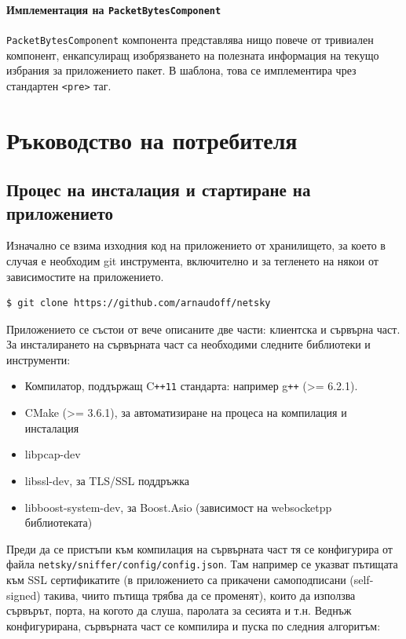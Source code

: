 \documentclass[12pt,a4paper,oneside]{book}
\begin{document}
\subsubsection{Имплементация на \texttt{PacketBytesComponent}}

\texttt{PacketBytesComponent} компонента представлява нищо повече от тривиален
компонент, енкапсулиращ изобрязването на полезната информация на текущо избрания
за приложението пакет. В шаблона, това се имплементира чрез стандартен
\texttt{<pre>} таг.

\chapter{Ръководство на потребителя}

\section{Процес на инсталация и стартиране на приложението}

Изначално се взима изходния код на приложението от хранилището, за което в
случая е необходим git инструмента, включително и
за тегленето на някои от зависимостите на приложението.

\begin{lstlisting}[language=bash,caption=Взимане на изходния код на приложението чрез
  \texttt{git}]
$ git clone https://github.com/arnaudoff/netsky
\end{lstlisting}

Приложението се състои от вече описаните две части: клиентска и сървърна част.
За инсталирането на сървърната част са необходими следните библиотеки и
инструменти:

\begin{itemize}
  \item
    Компилатор, поддържащ C\texttt{++11} стандарта: например g\texttt{++} (>= 6.2.1).
  \item
    CMake (>= 3.6.1), за автоматизиране на процеса на компилация и инсталация
  \item
    libpcap-dev
  \item
    libssl-dev, за TLS/SSL поддръжка
  \item
    libboost-system-dev, за Boost.Asio (зависимост на websocketpp библиотеката)
\end{itemize}

Преди да се пристъпи към компилация на сървърната част тя се конфигурира от
файла \texttt{netsky/sniffer/config/config.json}. Там например се указват
пътищата към SSL сертификатите (в приложението са прикачени самоподписани (self-signed)
такива, чиито пътища трябва да се променят), които да използва сървърът, порта, на когото да
слуша, паролата за сесията и т.н. Веднъж конфигурирана, сървърната част
се компилира и пуска по следния алгоритъм:
\end{document}
